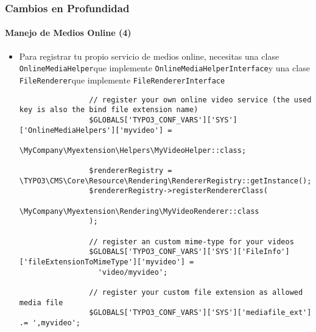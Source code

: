 \begin{frame}[fragile]
	\frametitle{Cambios en Profundidad}
	\framesubtitle{Manejo de Medios Online (4)}

	\lstset{basicstyle=\tiny\ttfamily}

	\begin{itemize}

		\item Para registrar tu propio servicio de medios online, necesitas una
			clase \small\texttt{OnlineMediaHelper}\normalsize\space que implemente
			\small\texttt{OnlineMediaHelperInterface}\normalsize\space y una
			clase \small\texttt{FileRenderer}\normalsize\space que implemente
			\small\texttt{FileRendererInterface}\normalsize\space

			\begin{lstlisting}
				// register your own online video service (the used key is also the bind file extension name)
				$GLOBALS['TYPO3_CONF_VARS']['SYS']['OnlineMediaHelpers']['myvideo'] =
				  \MyCompany\Myextension\Helpers\MyVideoHelper::class;

				$rendererRegistry = \TYPO3\CMS\Core\Resource\Rendering\RendererRegistry::getInstance();
				$rendererRegistry->registerRendererClass(
				  \MyCompany\Myextension\Rendering\MyVideoRenderer::class
				);

				// register an custom mime-type for your videos
				$GLOBALS['TYPO3_CONF_VARS']['SYS']['FileInfo']['fileExtensionToMimeType']['myvideo'] =
				  'video/myvideo';

				// register your custom file extension as allowed media file
				$GLOBALS['TYPO3_CONF_VARS']['SYS']['mediafile_ext'] .= ',myvideo';
			\end{lstlisting}

	\end{itemize}

\end{frame}


